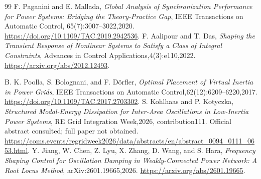 \documentclass[11pt]{article}
\begin{document}
\begin{thebibliography}{99}
 F. Paganini and E. Mallada,
\emph{Global Analysis of Synchronization Performance for Power Systems:
Bridging the Theory-Practice Gap}, IEEE Transactions on Automatic Control,
65(7):3007--3022,2020. \url{https://doi.org/10.1109/TAC.2019.2942536}.
 F. Aalipour and T. Das,
\emph{Shaping the Transient Response of Nonlinear Systems to Satisfy a Class
of Integral Constraints}, Advances in Control Applications,4(3):e110,2022.
\url{https://arxiv.org/abs/2012.12493}.


 B. K. Poolla, S. Bolognani, and F. D\"orfler,
\emph{Optimal Placement of Virtual Inertia in Power Grids},
IEEE Transactions on Automatic Control,62(12):6209--6220,2017.
\url{https://doi.org/10.1109/TAC.2017.2703302}.
 S. Kohlhaas and P. Kotyczka,
\emph{Structured Modal-Energy Dissipation for Inter-Area Oscillations in
Low-Inertia Power Systems}, RE Grid Integration Week,2026, contribution111.
Official abstract consulted; full paper not obtained.
\url{https://coms.events/regridweek2026/data/abstracts/en/abstract_0094_0111_0653.html}.
 Y. Jiang, W. Chen, Z. Lyu, X. Zhang, D. Wang, and S. Hara,
\emph{Frequency Shaping Control for Oscillation Damping in Weakly-Connected
Power Network: A Root Locus Method}, arXiv:2601.19665,2026.
\url{https://arxiv.org/abs/2601.19665}.

\end{thebibliography}
\end{document}
